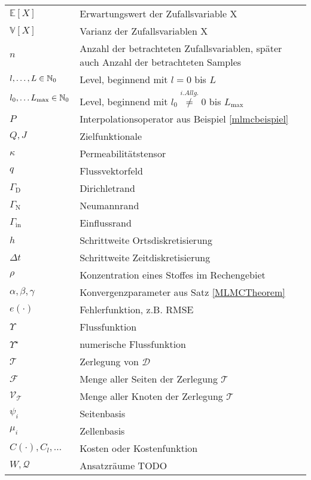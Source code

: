 \begin{longtable}[c]{ p{} p{}}
	$ \mathbb{E}[X] $ & Erwartungswert der Zufallsvariable X \\
	$ \mathbb{V}[X] $ & Varianz der Zufallsvariablen X \\
	$ n $ & Anzahl der betrachteten Zufallsvariablen, später auch Anzahl der betrachteten Samples \\
	$ l,\dots,L \in \mathbb{N}_0$ & Level, beginnend mit $ l=0 $ bis $ L $ \\
	$ l_0, \dots L_{\text{max}} \in \mathbb{N}_0 $ & Level, beginnend mit $ l_0 \stackrel{i.Allg.}{\not =} 0 $ bis $ L_{\text{max}} $  \\
	$ P $ & Interpolationsoperator aus Beispiel \ref{mlmcbeispiel} \\
	$ Q,J $ & Zielfunktionale \\
	$ \kappa $ & Permeabilitätstensor \\
	$ q $ & Flussvektorfeld \\
	$ \Gamma_{\text{D}} $ & Dirichletrand \\
	$ \Gamma_{\text{N}} $ & Neumannrand \\
	$ \Gamma_{\text{in}} $ & Einflussrand \\
	$ h $ & Schrittweite Ortsdiskretisierung \\
	$ \Delta t $ & Schrittweite Zeitdiskretisierung \\
	$ \rho $ & Konzentration eines Stoffes im Rechengebiet \\
	$ \alpha,\beta,\gamma $ & Konvergenzparameter aus Satz \ref{MLMCTheorem} \\
	$ e(\cdot) $ & Fehlerfunktion, z.B. RMSE \\
	$ \Upsilon $ & Flussfunktion \\
	$ \Upsilon^{\star} $ & numerische Flussfunktion \\
	$ \mathcal{T} $ & Zerlegung von $ \mathcal{D} $ \\
	$ \mathcal{F} $ & Menge aller Seiten der Zerlegung $ \mathcal{T} $ \\
	$ \mathcal{V}_{\mathcal{T}} $ & Menge aller Knoten der Zerlegung $ \mathcal{T} $\\
	$ {\psi_i} $ & Seitenbasis \\
	$ {\mu_i} $ & Zellenbasis \\
	$ C(\cdot) , C_l , \dots $ & Kosten oder Kostenfunktion \\
	$ W,\mathcal{Q} $ & Ansatzräume TODO\\
	\hline
\end{longtable}

